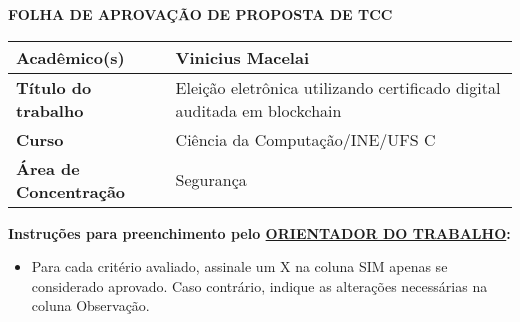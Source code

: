 \documentclass{ufsctex/ufsctex}
\begin{document}


\capa{}
\folhaderosto{}

\clearpage

\begin{mdframed}[backgroundcolor=lightgray, linewidth=0pt]
    \centering
    \textbf{FOLHA DE APROVAÇÃO DE PROPOSTA DE TCC}
\end{mdframed}

\vspace{-5mm}
\begin{table}[h]
  \begin{tabular}{|>{\bfseries}l|p{6.57cm}|}
    \hline
    Acadêmico(s)            & Vinicius Macelai                           \\ \hline
    Título do trabalho      & Eleição eletrônica utilizando
	  						certificado digital auditada em blockchain   \\ \hline
    Curso                   & Ciência da Computação/INE/UFS     C        \\ \hline
    Área de Concentração    & Segurança                                  \\ \hline
  \end{tabular}
\end{table}

\vspace{-2mm}
{\footnotesize\noindent\textbf{
  Instruções para preenchimento pelo \underline{ORIENTADOR DO TRABALHO}:} \\
  \begin{itemize}[leftmargin=3.6mm,label=-]
    \vspace{-4mm}
    \item Para cada critério avaliado, assinale um X na coluna SIM apenas
        se considerado aprovado. Caso contrário, indique as alterações
        necessárias na coluna Observação.
  \end{itemize}
}
\end{document}
